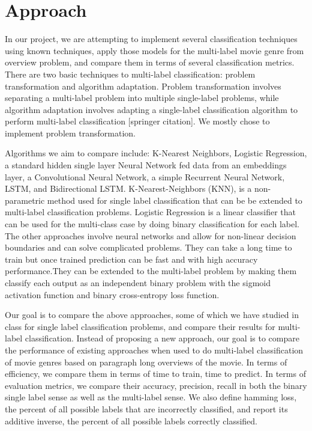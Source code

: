 \documentclass[sigconf]{acmart}
\begin{document}
\section{Approach}
In our project, we are attempting to implement several classification techniques using known techniques, apply those models for the multi-label movie genre from overview problem, and compare them in terms of several classification metrics. There are two basic techniques to multi-label classification: problem transformation and algorithm adaptation. Problem transformation involves separating a multi-label problem into multiple single-label problems, while algorithm adaptation involves adapting a single-label classification algorithm to perform multi-label classification [springer citation]. We mostly chose to implement problem transformation.

Algorithms we aim to compare include: K-Nearest Neighbors, Logistic Regression, a standard hidden single layer Neural Network fed data from an embeddings layer, a Convolutional Neural Network, a simple Recurrent Neural Network, LSTM, and Bidirectional LSTM. K-Nearest-Neighbors (KNN), is a non-parametric method used for single label classification that can be be extended to multi-label classification problems. Logistic Regression is a linear classifier that can be used for the multi-class case by doing binary classification for each label. The other approaches involve neural networks and allow for non-linear decision boundaries and can solve complicated problems. They can take a long time to train but once trained prediction can be fast and with high accuracy performance.They can be extended to the multi-label problem by making them classify each output as an independent binary problem with the sigmoid activation function and binary cross-entropy loss function.  

Our goal is to compare the above approaches, some of which we have studied in class for single label classification problems, and compare their results for multi-label classification. Instead of proposing a new approach, our goal is to compare the performance of existing approaches when used to do multi-label classification of movie genres based on paragraph long overviews of the movie. In terms of efficiency, we compare them in terms of time to train, time to predict. In terms of evaluation metrics, we compare their accuracy, precision, recall in both the binary single label sense as well as the multi-label sense. We also define hamming loss, the percent of all possible labels that are incorrectly classified, and report its additive inverse, the percent of all possible labels correctly classified. 
\end{document}
